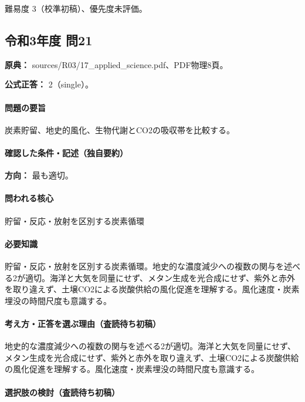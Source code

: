 \par 難易度 3（校準初稿）、優先度未評価。

\subsection{令和3年度 問21}
\label{q:r03-reg-applied-21}

\noindent\textbf{原典：} sources/R03/17\_applied\_science.pdf、PDF物理8頁。

\textbf{公式正答：} 2（single）。

\paragraph{問題の要旨} 炭素貯留、地史的風化、生物代謝とCO2の吸収帯を比較する。

\paragraph{確認した条件・記述（独自要約）}\mbox{}\par

\noindent\textbf{方向：} 最も適切。\par

\paragraph{問われる核心} 貯留・反応・放射を区別する炭素循環

\paragraph{必要知識} 貯留・反応・放射を区別する炭素循環。地史的な濃度減少への複数の関与を述べる2が適切。海洋と大気を同量にせず、メタン生成を光合成にせず、紫外と赤外を取り違えず、土壌CO2による炭酸供給の風化促進を理解する。風化速度・炭素埋没の時間尺度も意識する。

\paragraph{考え方・正答を選ぶ理由（査読待ち初稿）} 地史的な濃度減少への複数の関与を述べる2が適切。海洋と大気を同量にせず、メタン生成を光合成にせず、紫外と赤外を取り違えず、土壌CO2による炭酸供給の風化促進を理解する。風化速度・炭素埋没の時間尺度も意識する。

\paragraph{選択肢の検討（査読待ち初稿）}\mbox{}\par

